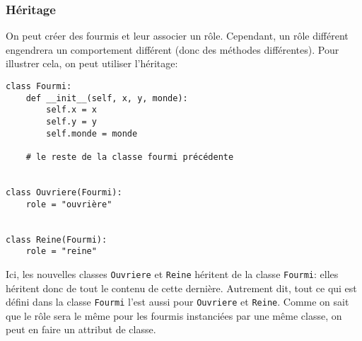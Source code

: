 \subsubsection{Héritage}

On peut créer des fourmis et leur associer un rôle. Cependant, un rôle différent engendrera un comportement différent (donc des méthodes différentes). Pour illustrer cela, on peut utiliser l'héritage:

\begin{verbatim}
class Fourmi:
    def __init__(self, x, y, monde):
        self.x = x
        self.y = y
        self.monde = monde
    
    # le reste de la classe fourmi précédente


class Ouvriere(Fourmi):
    role = "ouvrière"


class Reine(Fourmi):
    role = "reine"
\end{verbatim}

Ici, les nouvelles classes \texttt{Ouvriere} et \texttt{Reine} héritent de la classe \texttt{Fourmi}: elles héritent donc de tout le contenu de cette dernière. Autrement dit, tout ce qui est défini dans la classe \texttt{Fourmi} l'est aussi pour \texttt{Ouvriere} et \texttt{Reine}. Comme on sait que le rôle sera le même pour les fourmis instanciées par une même classe, on peut en faire un attribut de classe.
